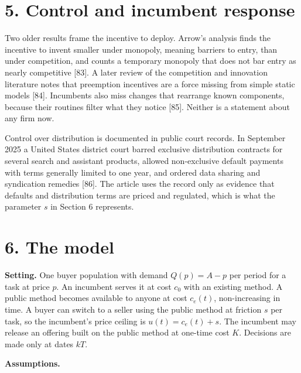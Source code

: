 \documentclass[10pt,letterpaper]{article}
\begin{document}
\section{5. Control and incumbent
response}\label{control-and-incumbent-response}

Two older results frame the incentive to deploy. Arrow's analysis finds
the incentive to invent smaller under monopoly, meaning barriers to
entry, than under competition, and counts a temporary monopoly that does
not bar entry as nearly competitive {[}83{]}. A later review of the
competition and innovation literature notes that preemption incentives
are a force missing from simple static models {[}84{]}. Incumbents also
miss changes that rearrange known components, because their routines
filter what they notice {[}85{]}. Neither is a statement about any firm
now.

Control over distribution is documented in public court records. In
September 2025 a United States district court barred exclusive
distribution contracts for several search and assistant products,
allowed non-exclusive default payments with terms generally limited to
one year, and ordered data sharing and syndication remedies {[}86{]}.
The article uses the record only as evidence that defaults and
distribution terms are priced and regulated, which is what the parameter
\(s\) in Section 6 represents.

\section{6. The model}\label{the-model}

\textbf{Setting.} One buyer population with demand \(Q(p) = A - p\) per
period for a task at price \(p\). An incumbent serves it at cost \(c_0\)
with an existing method. A public method becomes available to anyone at
cost \(c_e(t)\), non-increasing in time. A buyer can switch to a seller
using the public method at friction \(s\) per task, so the incumbent's
price ceiling is \(u(t) = c_e(t) + s\). The incumbent may release an
offering built on the public method at one-time cost \(K\). Decisions
are made only at dates \(kT\).

\textbf{Assumptions.}
\end{document}
